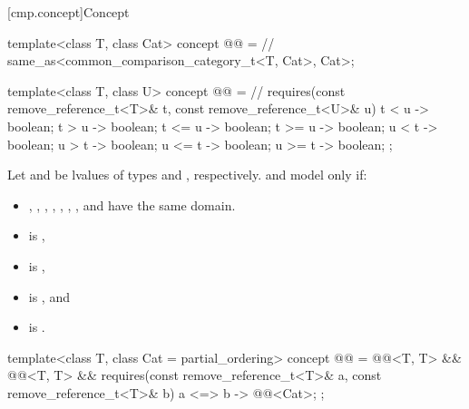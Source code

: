 [cmp.concept]{Concept }

\begin{codeblock}
template<class T, class Cat>
  concept @@ =                 // \expos
    same_as<common_comparison_category_t<T, Cat>, Cat>;

template<class T, class U>
  concept @@ =      // \expos
    requires(const remove_reference_t<T>& t, const remove_reference_t<U>& u) {
      { t <  u } -> boolean;
      { t >  u } -> boolean;
      { t <= u } -> boolean;
      { t >= u } -> boolean;
      { u <  t } -> boolean;
      { u >  t } -> boolean;
      { u <= t } -> boolean;
      { u >= t } -> boolean;
    };
\end{codeblock}

\pnum
Let  and  be
lvalues of types  and
, respectively.
 and  model
 only if:
\begin{itemize}
\item
  ,
  ,
  ,
  ,
  ,
  ,
  , and
  have the same domain.
\item
   is ,
\item
   is ,
\item
   is , and
\item
   is .
\end{itemize}

%
\begin{codeblock}
template<class T, class Cat = partial_ordering>
  concept @@ =
    @@<T, T> &&
    @@<T, T> &&
    requires(const remove_reference_t<T>& a, const remove_reference_t<T>& b) {
      { a <=> b } -> @@<Cat>;
    };
\end{codeblock}

